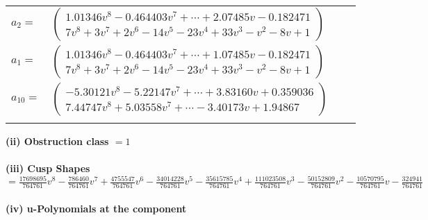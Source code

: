 \documentclass[1p]{elsarticle_modified}
\theoremstyle{definition}
\begin{document}
\begin{tabular}{m{7pt} m{180pt} m{7pt} m{180pt} }
\flushright $a_{2}=$&$\begin{pmatrix}1.01346 v^{8}-0.464403 v^{7}+\cdots+2.07485 v-0.182471\\7 v^8+3 v^7+2 v^6-14 v^5-23 v^4+33 v^3- v^2-8 v+1\end{pmatrix}$ \\
\flushright $a_{1}=$&$\begin{pmatrix}1.01346 v^{8}-0.464403 v^{7}+\cdots+1.07485 v-0.182471\\7 v^8+3 v^7+2 v^6-14 v^5-23 v^4+33 v^3- v^2-8 v+1\end{pmatrix}$ \\
\flushright $a_{10}=$&$\begin{pmatrix}-5.30121 v^{8}-5.22147 v^{7}+\cdots+3.83160 v+0.359036\\7.44747 v^{8}+5.03558 v^{7}+\cdots-3.40173 v+1.94867\end{pmatrix}$\\&\end{tabular}
\flushleft \textbf{(ii) Obstruction class $= 1$}\\~\\
\flushleft \textbf{(iii) Cusp Shapes $= \frac{17698695}{764761} v^8-\frac{786460}{764761} v^7+\frac{4755547}{764761} v^6-\frac{34014228}{764761} v^5-\frac{35615785}{764761} v^4+\frac{111023508}{764761} v^3-\frac{50152809}{764761} v^2-\frac{10570795}{764761} v-\frac{324941}{764761}$}\\~\\
\newpage\renewcommand{\arraystretch}{1}
\flushleft \textbf{(iv) u-Polynomials at the component}\newline \\
\end{document}
